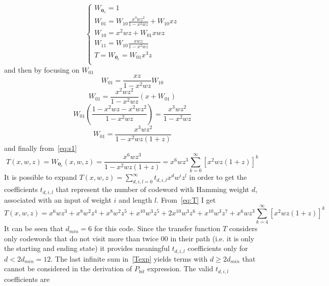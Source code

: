 \documentclass[10pt]{article}
\begin{document}
\begin{equation}
\begin{cases}
	W_{\mathbf{0}_s} = 1 \\ %
	W_{01} = W_{10}\frac{x^3wz^2}{1-x^2wz} + W_{10}xz \\
	W_{10} = x^2wz + W_{01}xwz \\
	W_{11} = W_{10}\frac{xwz}{1-x^2wz} \\
	T = W_{\mathbf{0}_e} = W_{01}x^3z\\
\end{cases}
\end{equation}
and then by focusing on $W_{01}$
\begin{equation*}
	W_{01} =  \frac{xz}{1-x^2wz}W_{10}
\end{equation*}
\begin{equation*}
	W_{01}  =  \frac{x^2wz^2}{1-x^2wz}(x + W_{01})
\end{equation*}
\begin{equation*}
	W_{01}\left(\frac{1 - x^2wz - x^2wz^2}{1-x^2wz} \right) = \frac{x^3wz^2}{1-x^2wz}
\end{equation*}
\begin{equation*}
	W_{01} = \frac{x^3wz^2}{1-x^2wz(1+z)}
\end{equation*}
and finally from~\eqref{eq:s1}
\begin{equation}\label{eq:T}
	T(x, w, z) = W_{\mathbf{0}_e}(x, w, z) = \frac{x^6wz^3}{1-x^2wz(1+z)} = x^6wz^3\sum_{k=0}^{\infty} [x^2wz(1+z)]^k
\end{equation}
It is possible to expand $T(x,w,z) = \sum_{d, i, l = 0}^{\infty} t_{d, i, l}x^dw^iz^l$ in order to get the coefficients $t_{d,i,l}$ that represent the number of codeword with Hamming weight $d$, associated with an input of weight $i$ and length $l$. From~\eqref{eq:T} I get
\begin{equation}\label{Texp}
	T(x, w, z) = x^6wz^3 + x^8w^2z^4 + x^8w^2z^5 + x^{10}w^3z^5 + 2x^{10}w^3z^6 + x^{10}w^3z^7 + x^6wz^3\sum_{k=4}^{\infty}[x^2wz(1+z)]^k
\end{equation}
It can be seen that $d_{min}=6$ for this code. Since the transfer function $T$ considers only codewords that do not visit more than twice $00$ in their path (i.e. it is only the starting and ending state) it provides meaningful $t_{d, i, l}$ coefficients only for $d < 2d_{min} = 12$. The last infinite sum in~\eqref{Texp} yields terms with $d \ge 2d_{min}$ that cannot be considered in the derivation of $P_{bit}$ expression. The valid $t_{d, i, l}$ coefficients are
\end{document}
